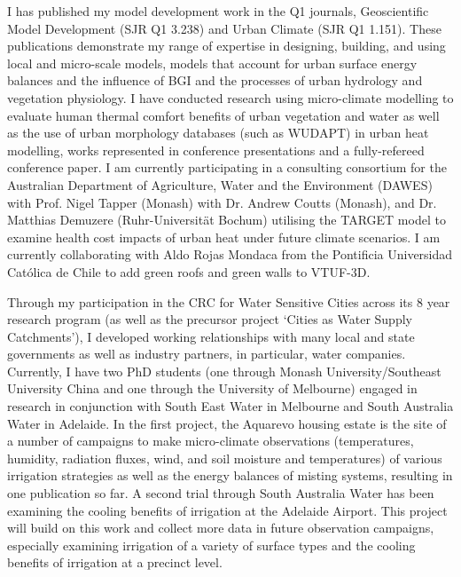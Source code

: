 I has published my model development work\textbf{\cite{Nice2018a,Broadbent2019c,Meili2020,Dommenget2019}} in the Q1 journals, Geoscientific Model Development (SJR Q1 3.238) and Urban Climate (SJR Q1 1.151). These publications demonstrate my range of expertise in designing, building, and using local and micro-scale models, models that account for urban surface energy balances and the influence of BGI and the processes of urban hydrology and vegetation physiology. I have conducted research using micro-climate modelling to evaluate human thermal comfort benefits of urban vegetation and water as well as the use of urban morphology databases (such as WUDAPT) in urban heat modelling, works represented in conference presentations\textbf{\cite{Gal2020,Nice2020b}} and a fully-refereed conference paper\textbf{\cite{Todorovic2019a}}. I am currently participating in a consulting consortium for the Australian Department of Agriculture, Water and the Environment (DAWES) with Prof. Nigel Tapper (Monash) with Dr. Andrew Coutts (Monash), and Dr. Matthias Demuzere (Ruhr-Universit\"{a}t Bochum) utilising the TARGET model to examine health cost impacts of urban heat under future climate scenarios. I am currently collaborating with Aldo Rojas Mondaca from the Pontificia Universidad Cat\'{o}lica de Chile to add green roofs and green walls to VTUF-3D.

Through my participation in the CRC for Water Sensitive Cities across its 8 year research program (as well as the precursor project `Cities as Water Supply Catchments'), I developed working relationships with many local and state governments as well as industry partners, in particular, water companies. Currently, I have two PhD students (one through Monash University/Southeast University China and one through the University of Melbourne) engaged in research in conjunction with South East Water in Melbourne and South Australia Water in Adelaide. In the first project, the Aquarevo housing estate\cite{SEW2020} is the site of a number of campaigns to make micro-climate observations (temperatures, humidity, radiation fluxes, wind, and soil moisture and temperatures) of various irrigation strategies as well as the energy balances of misting systems, resulting in one publication \textbf{\cite{Cheung2021}} so far. A second trial through South Australia Water has been examining the cooling benefits of irrigation at the Adelaide Airport\cite{CRCWCS2018,Ingleton2020,Qian2020}. This project will build on this work and collect more data in future observation campaigns, especially examining irrigation of a variety of surface types and the cooling benefits of irrigation at a precinct level.

